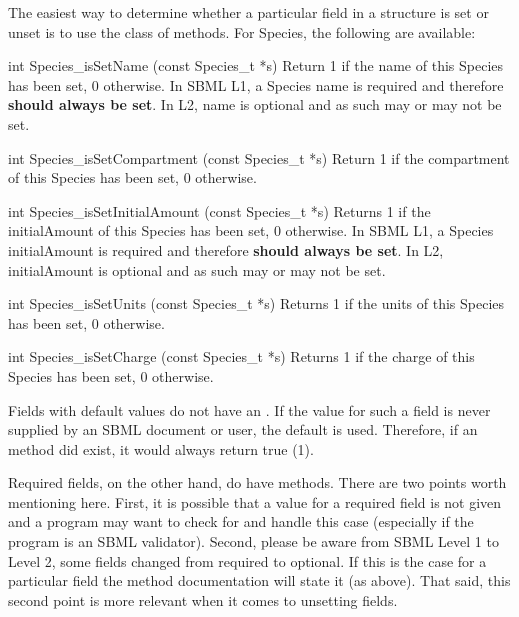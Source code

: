 \documentclass{sbmlmanual}
\begin{document}
The easiest way to determine whether a particular field in a structure is
set or unset is to use the  class of methods.  For
Species, the following are available:


\begin{methoddef}{int Species\_isSetName (const Species\_t *s)}
  Return 1 if the name of this Species has been set, 0 otherwise.  In
  SBML L1, a Species name is required and therefore \textbf{should
  always be set}.  In L2, name is optional and as such may or may not
  be set.
\end{methoddef}

\begin{methoddef}{int Species\_isSetCompartment (const Species\_t *s)}
  Return 1 if the compartment of this Species has been set, 0 otherwise.
\end{methoddef}

\begin{methoddef}{int Species\_isSetInitialAmount (const Species\_t *s)}
  Returns 1 if the initialAmount of this Species has been set, 0
  otherwise.  In SBML L1, a Species initialAmount is required and
  therefore \textbf{should always be set}.  In L2, initialAmount is
  optional and as such may or may not be set.
\end{methoddef}

\begin{methoddef}{int Species\_isSetUnits (const Species\_t *s)}
  Returns 1 if the units of this Species has been set, 0 otherwise.
\end{methoddef}

\begin{methoddef}{int Species\_isSetCharge (const Species\_t *s)}
  Returns 1 if the charge of this Species has been set, 0 otherwise.
\end{methoddef}


Fields with default values do not have an .  If the
value for such a field is never supplied by an SBML document or user,
the default is used. Therefore, if an  method did
exist, it would always return true (1).

Required fields, on the other hand, do have 
methods.  There are two points worth mentioning here.  First, it is
possible that a value for a required field is not given and a program
may want to check for and handle this case (especially if the program
is an SBML validator).  Second, please be aware from SBML Level 1 to
Level 2, some fields changed from required to optional.  If this is
the case for a particular field the method documentation will state it
(as above).  That said, this second point is more relevant when it
comes to unsetting fields.
\end{document}
